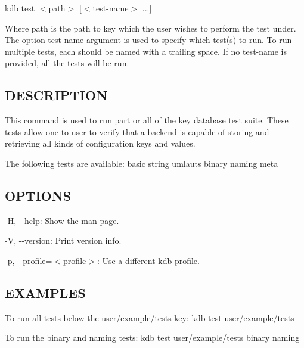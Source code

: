 {\ttfamily kdb test $<$path$>$ \mbox{[}$<$test-\/name$>$ ...\mbox{]}}

Where {\ttfamily path} is the path to key which the user wishes to perform the test under. The option {\ttfamily test-\/name} argument is used to specify which test(s) to run. To run multiple tests, each should be named with a trailing space. If no {\ttfamily test-\/name} is provided, all the tests will be run.

\subsection*{D\+E\+S\+C\+R\+I\+P\+T\+I\+O\+N}

This command is used to run part or all of the key database test suite. These tests allow one to user to verify that a backend is capable of storing and retrieving all kinds of configuration keys and values.

The following tests are available\+: basic string umlauts binary naming meta

\subsection*{O\+P\+T\+I\+O\+N\+S}


\begin{DoxyItemize}
\item {\ttfamily -\/\+H}, {\ttfamily -\/-\/help}\+: Show the man page.
\item {\ttfamily -\/\+V}, {\ttfamily -\/-\/version}\+: Print version info.
\item {\ttfamily -\/p}, {\ttfamily -\/-\/profile}=$<$profile$>$\+: Use a different kdb profile.
\end{DoxyItemize}

\subsection*{E\+X\+A\+M\+P\+L\+E\+S}

To run all tests below the {\ttfamily user/example/tests} key\+: {\ttfamily kdb test user/example/tests}

To run the {\ttfamily binary} and {\ttfamily naming} tests\+: {\ttfamily kdb test user/example/tests binary naming} 